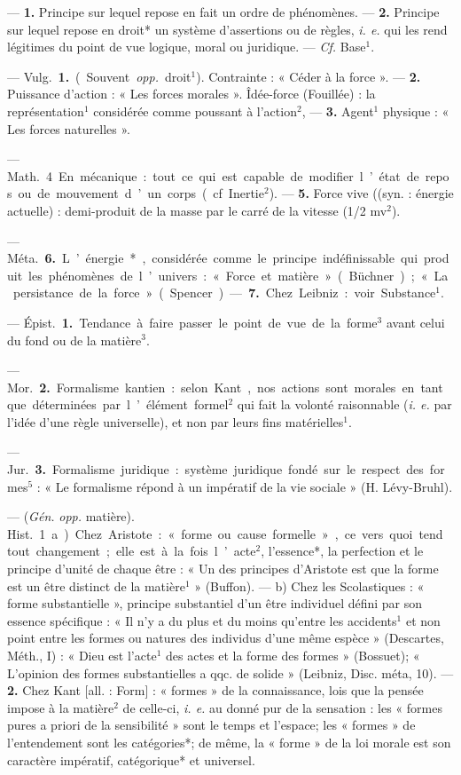 \begin{itemize}[leftmargin=1cm, label=, itemsep=1pt]
 — {\bf 1.} Principe sur lequel
repose en fait un ordre de phénomènes. — {\bf 2.} Principe sur lequel
repose en droit* un système d’assertions ou de règles, {\it i. e.} qui les rend
légitimes du point de vue logique,
moral ou juridique. — {\it Cf.} Base$^1$.

 — \si{Vulg.} {\bf 1.} (Souvent {\it opp.}

droit$^1$). Contrainte : « Céder à la
force ». — {\bf 2.} Puissance d'action :
« Les forces morales ». Îdée-force
(Fouillée) : la représentation$^1$ considérée comme poussant à l’action$^2$,
— {\bf 3.} Agent$^1$ physique : « Les forces
naturelles ».

— \si{Math.} 4 En mécanique : tout
ce qui est capable de modifier l’état
de repos ou de mouvement d’un
corps (cf. Inertie$^2$). — {\bf 5.} Force vive
((syn. : énergie actuelle) : demi-produit de la masse par le carré de la
vitesse (1/2 mv$^2$).

— \si{Méta.} {\bf 6.} L’énergie*, considérée
comme le principe indéfinissable
qui produit les phénomènes de l’univers : « Force et matière » (Büchner);
« La persistance de la force » (Spencer).
— {\bf 7.} Chez Leibniz: voir Substance$^1$.

 — \si{Épist.} {\bf 1.} Tendance à
faire passer le point de vue de la
forme$^3$ avant celui du fond ou de
la matière$^3$.

— \si{Mor.} {\bf 2.} Formalisme kantien :
selon Kant, nos actions sont morales
en tant que déterminées par l’élément formel$^2$ qui fait la volonté
raisonnable ({\it i. e.} par l’idée d’une
règle universelle), et non par leurs
fins matérielles$^1$.

— \si{Jur.} {\bf 3.} Formalisme juridique :
système juridique fondé sur le respect des formes$^5$ : « Le formalisme
répond à un impératif de la vie
sociale » (H. Lévy-Bruhl).

 — ({\it Gén.} {\it opp.} matière). \si{Hist.}
1. a) Chez Aristote : « forme ou cause
formelle », ce vers quoi tend tout
changement; elle est à la fois l’acte$^2$,
l'essence*, la perfection et le principe d'unité de chaque être : « Un
des principes d’Aristote est que la
forme est un être distinct de la
matière$^1$ » (Buffon). — b) Chez les
Scolastiques : « forme substantielle »,
principe substantiel d’un être individuel défini par son essence spécifique : « Il n’y a du plus et du moins
qu'entre les accidents$^1$ et non point
entre les formes ou natures des individus d’une même espèce » (Descartes, Méth., I) : « Dieu est l’acte$^1$
des actes et la forme des formes »
(Bossuet); « L'opinion des formes
substantielles a qqc. de solide »
(Leibniz, Disc. méta, 10). — {\bf 2.} Chez
Kant [all. : Form] : « formes » de la
connaissance, lois que la pensée
impose à la matière$^2$ de celle-ci, {\it i. e.}
au donné pur de la sensation : les
« formes pures a priori de la sensibilité » sont le temps et l’espace;
les « formes » de l’entendement sont
les catégories*; de même, la « forme »
de la loi morale est son caractère
impératif, catégorique* et universel.


\end{itemize}
